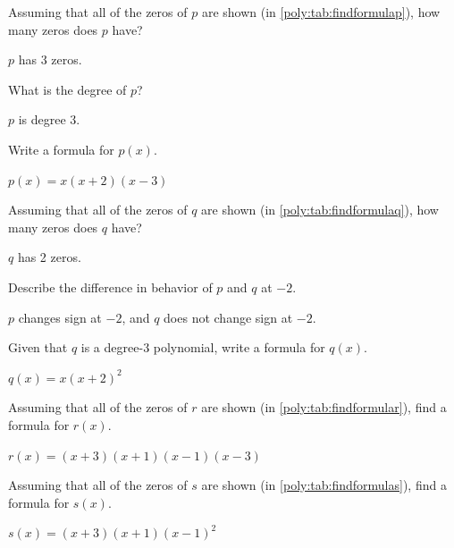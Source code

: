 \begin{exercises}
\begin{problem}
	 \begin{subproblem}
		 Assuming that all of the zeros of $p$ are shown (in \cref{poly:tab:findformulap}), how many zeros does $p$ have?
		 \begin{shortsolution}
			 $p$ has 3 zeros.
		 \end{shortsolution}
	 \end{subproblem}
	 \begin{subproblem}
		 What is the degree of $p$?
		 \begin{shortsolution}
			 $p$ is degree 3.
		 \end{shortsolution}
	 \end{subproblem}
	 \begin{subproblem}
		 Write a formula for $p(x)$.
		 \begin{shortsolution}
			 $p(x)=x(x+2)(x-3)$
		 \end{shortsolution}
	 \end{subproblem}
	 \begin{subproblem}
		 Assuming that all of the zeros of $q$ are shown (in \cref{poly:tab:findformulaq}), how many zeros does $q$ have?
		 \begin{shortsolution}
			 $q$ has 2 zeros.
		 \end{shortsolution}
	 \end{subproblem}
	 \begin{subproblem}
		 Describe the difference in behavior of $p$ and $q$ at $-2$.
		 \begin{shortsolution}
			 $p$ changes sign at $-2$, and $q$ does not change sign at $-2$.
		 \end{shortsolution}
	 \end{subproblem}
	 \begin{subproblem}
		 Given that $q$ is a degree-$3$ polynomial, write a formula for $q(x)$.
		 \begin{shortsolution}
			 $q(x)=x(x+2)^2$
		 \end{shortsolution}
	 \end{subproblem}
	 \begin{subproblem}
		 Assuming that all of the zeros of $r$ are shown (in \cref{poly:tab:findformular}), find a formula for $r(x)$.
		 \begin{shortsolution}
			 $r(x)=(x+3)(x+1)(x-1)(x-3)$
		 \end{shortsolution}
	 \end{subproblem}
	 \begin{subproblem}
		 Assuming that all of the zeros of $s$ are shown (in \cref{poly:tab:findformulas}), find a formula for $s(x)$.
		 \begin{shortsolution}
			 $s(x)=(x+3)(x+1)(x-1)^2$
		 \end{shortsolution}
	 \end{subproblem}
	 \end{problem}
	 \end{exercises}

